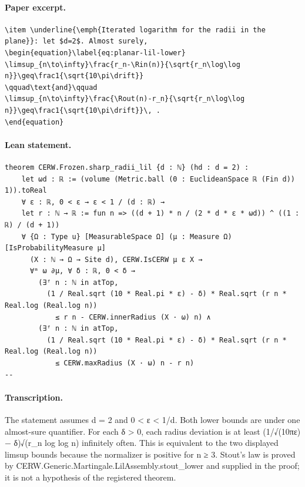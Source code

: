 \paragraph{Paper excerpt.}
\begin{verbatim}
\item \underline{\emph{Iterated logarithm for the radii in the plane}}: let $d=2$. Almost surely,
\begin{equation}\label{eq:planar-lil-lower}
\limsup_{n\to\infty}\frac{r_n-\Rin(n)}{\sqrt{r_n\log\log n}}\geq\frac1{\sqrt{10\pi\drift}}
\qquad\text{and}\qquad
\limsup_{n\to\infty}\frac{\Rout(n)-r_n}{\sqrt{r_n\log\log n}}\geq\frac1{\sqrt{10\pi\drift}}\, .
\end{equation}
\end{verbatim}
\paragraph{Lean statement.}
\begin{verbatim}
theorem CERW.Frozen.sharp_radii_lil {d : ℕ} (hd : d = 2) :
    let ωd : ℝ := (volume (Metric.ball (0 : EuclideanSpace ℝ (Fin d)) 1)).toReal
    ∀ ε : ℝ, 0 < ε → ε < 1 / (d : ℝ) →
    let r : ℕ → ℝ := fun n => ((d + 1) * n / (2 * d * ε * ωd)) ^ ((1 : ℝ) / (d + 1))
    ∀ {Ω : Type u} [MeasurableSpace Ω] (μ : Measure Ω) [IsProbabilityMeasure μ]
      (X : ℕ → Ω → Site d), CERW.IsCERW μ ε X →
      ∀ᵐ ω ∂μ, ∀ δ : ℝ, 0 < δ →
        (∃ᶠ n : ℕ in atTop,
          (1 / Real.sqrt (10 * Real.pi * ε) - δ) * Real.sqrt (r n * Real.log (Real.log n))
            ≤ r n - CERW.innerRadius (X · ω) n) ∧
        (∃ᶠ n : ℕ in atTop,
          (1 / Real.sqrt (10 * Real.pi * ε) - δ) * Real.sqrt (r n * Real.log (Real.log n))
            ≤ CERW.maxRadius (X · ω) n - r n)
--
\end{verbatim}
\paragraph{Transcription.}
The statement assumes d = 2 and 0 < ε < 1/d. Both lower bounds are under one almost-sure quantifier. For each δ > 0, each radius deviation is at least (1/√(10πε) − δ)√(r_n log log n) infinitely often. This is equivalent to the two displayed limsup bounds because the normalizer is positive for n ≥ 3. Stout's law is proved by CERW.Generic.Martingale.LilAssembly.stout_lower and supplied in the proof; it is not a hypothesis of the registered theorem.
